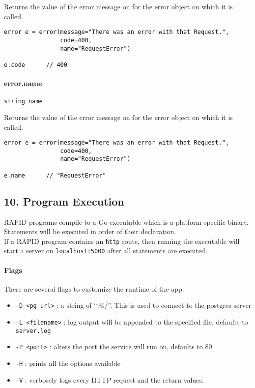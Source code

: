 \documentclass[]{article}
\begin{document}
Returns the value of the error message on for the error object on which
it is called.

\begin{verbatim}
error e = error(message="There was an error with that Request.",
                code=400,
                name="RequestError")

e.code      // 400
\end{verbatim}

\paragraph{error.name}\label{error.name}

\begin{verbatim}
string name
\end{verbatim}

Returns the value of the error message on for the error object on which
it is called.

\begin{verbatim}
error e = error(message="There was an error with that Request.",
                code=400,
                name="RequestError")

e.name      // "RequestError"
\end{verbatim}

\subsection{10. Program Execution}\label{program-execution}

RAPID programs compile to a Go executable which is a platform specific
binary.\\Statements will be executed in order of their declaration.\\If
a RAPID program contains an \texttt{http} route, then running the
executable will start a server on \texttt{localhost:5000} after all
statements are executed.

\paragraph{Flags}\label{flags}

There are several flags to customize the runtime of the app.

\begin{itemize}
\itemsep1pt\parskip0pt
\item
  \texttt{-D \textless{}pg\_url\textgreater{}} : a string of ``:@/''.
  This is used to connect to the postgres server
\item
  \texttt{-L \textless{}filename\textgreater{}} : log output will be
  appended to the specified file, defaults to \texttt{server.log}
\item
  \texttt{-P \textless{}port\textgreater{}} : alters the port the
  service will run on, defaults to 80
\item
  \texttt{-H} : prints all the options available
\item
  \texttt{-V} : verbosely logs every HTTP request and the return values.
\end{itemize}
\end{document}
